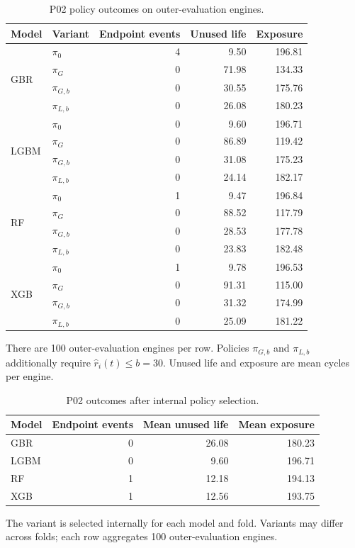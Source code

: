 \documentclass[12pt]{article}
\newcommand{\tablenotes}[1]{\par\smallskip\footnotesize #1}
\begin{document}
\begin{table}[htbp]
\centering
\caption{P02 policy outcomes on outer-evaluation engines.}
\label{tab:pilot-policies}
\footnotesize
\setlength{\tabcolsep}{3pt}
\begin{tabularx}{\linewidth}{@{}lXrrr@{}}
\toprule
Model & Variant & Endpoint events & Unused life & Exposure \\
\midrule
\multirow{4}{*}{GBR} & $\pi_0$ & 4 & 9.50 & 196.81 \\
 & $\pi_G$ & 0 & 71.98 & 134.33 \\
 & $\pi_{G,b}$ & 0 & 30.55 & 175.76 \\
 & $\pi_{L,b}$ & 0 & 26.08 & 180.23 \\
\midrule
\multirow{4}{*}{LGBM} & $\pi_0$ & 0 & 9.60 & 196.71 \\
 & $\pi_G$ & 0 & 86.89 & 119.42 \\
 & $\pi_{G,b}$ & 0 & 31.08 & 175.23 \\
 & $\pi_{L,b}$ & 0 & 24.14 & 182.17 \\
\midrule
\multirow{4}{*}{RF} & $\pi_0$ & 1 & 9.47 & 196.84 \\
 & $\pi_G$ & 0 & 88.52 & 117.79 \\
 & $\pi_{G,b}$ & 0 & 28.53 & 177.78 \\
 & $\pi_{L,b}$ & 0 & 23.83 & 182.48 \\
\midrule
\multirow{4}{*}{XGB} & $\pi_0$ & 1 & 9.78 & 196.53 \\
 & $\pi_G$ & 0 & 91.31 & 115.00 \\
 & $\pi_{G,b}$ & 0 & 31.32 & 174.99 \\
 & $\pi_{L,b}$ & 0 & 25.09 & 181.22 \\
\bottomrule
\end{tabularx}
\tablenotes{There are 100 outer-evaluation engines per row. Policies $\pi_{G,b}$ and $\pi_{L,b}$ additionally require $\widehat r_i(t)\leq b=30$. Unused life and exposure are mean cycles per engine.}
\end{table}

\begin{table}[htbp]
\centering
\caption{P02 outcomes after internal policy selection.}
\label{tab:pilot-selected}
\footnotesize
\setlength{\tabcolsep}{3pt}
\begin{tabularx}{\linewidth}{@{}Xrrr@{}}
\toprule
Model & Endpoint events & Mean unused life & Mean exposure \\
\midrule
GBR & 0 & 26.08 & 180.23 \\
LGBM & 0 & 9.60 & 196.71 \\
RF & 1 & 12.18 & 194.13 \\
XGB & 1 & 12.56 & 193.75 \\
\bottomrule
\end{tabularx}
\tablenotes{The variant is selected internally for each model and fold. Variants may differ across folds; each row aggregates 100 outer-evaluation engines.}
\end{table}
\end{document}
